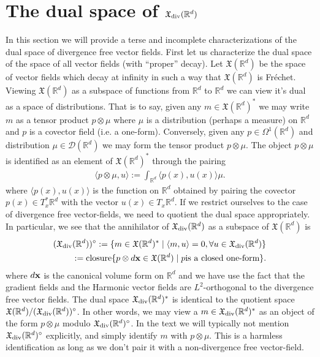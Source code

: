 \documentclass[12pt]{amsart}
\newcommand{\R}{\ensuremath{\mathbb{R}}}
\begin{document}
\section{The dual space of $\mathfrak{X}_{\rm div}(\R^d)$}
\label{sec:measure_valued_momap}
In this section we will provide a terse and incomplete
characterizations of the dual space of divergence free 
vector fields.  First let us characterize the dual space of the space of all vector fields (with ``proper'' decay).
Let $\mathfrak{X}(\R^d)$ be the space of vector fields which decay at infinity
in such a way that $\mathfrak{X}(\R^d)$ is Fr\'echet.
Viewing $\mathfrak{X}(\R^d)$ as a subspace of functions from $\R^d$ to $\R^d$
we can view it's dual as a space of distributions.
That is to say, given any $m \in \mathfrak{X}(\R^d)^*$ we may write $m$ as a tensor
product $p \otimes \mu$ where $\mu$ is a distribution (perhaps a measure)
on $\R^d$ and $p$ is a covector field (i.e. a one-form).
Conversely, given any $p \in \Omega^1(\R^d)$ and distribution $\mu \in \mathcal{D}(\R^d)$
we may form the tensor product $p \otimes \mu$.
The object $p\otimes \mu$ is identified as an element of $\mathfrak{X}(\R^d)^*$ through
the pairing
\begin{align*}
	\langle p \otimes \mu , u \rangle :=  \int_{\R^d} \langle p(x) , u(x) \rangle \mu.
\end{align*}
where $\langle p(x),u(x) \rangle$ is the function on $\R^d$ obtained by pairing the covector $p(x) \in T_x^*\R^d$ with the vector $u(x) \in T_x\R^d$.
If we restrict ourselves to the case of divergence free vector-fields, we need to quotient
the dual space appropriately.  In particular, we see that the annihilator of $\mathfrak{X}_{\rm div}(\R^d)$
as a subspace of $\mathfrak{X}(\R^d)$ is
\begin{align*}
	(\mathfrak{X}_{\rm div}(\R^d) )^\circ := \{ m \in \mathfrak{X}(\R^d)^* \mid \langle m , u \rangle = 0 , \forall u \in \mathfrak{X}_{\rm div}(\R^d) \}\\
		:= {\rm closure}\{ p \otimes d{\bf x} \in \mathfrak{X}(\R^d) \mid p \text{is a closed one-form} \}.
\end{align*}
where $d{\bf x}$ is the canonical volume form on $\R^d$ and
we have use the fact that the gradient fields and the Harmonic vector fields are $L^2$-orthogonal to the divergence free vector fields.
The dual space $\mathfrak{X}_{\rm div}(\R^d)^*$ is identical to the quotient space $\mathfrak{X}(\R^d) / (\mathfrak{X}_{\rm div}(\R^d))^\circ$.
In other words, we may view a $m \in \mathfrak{X}_{\rm div}(\R^d)^*$ as an object of the form $p \otimes \mu$ modulo $\mathfrak{X}_{\rm div}(\R^d)^\circ$.
In the text we will typically not mention $\mathfrak{X}_{\rm div}(\R^d)^\circ$ explicitly, and simply identify $m$ with $p \otimes \mu$.
This is a harmless identification as long as we don't pair it with a non-divergence free vector-field.



\end{document}
